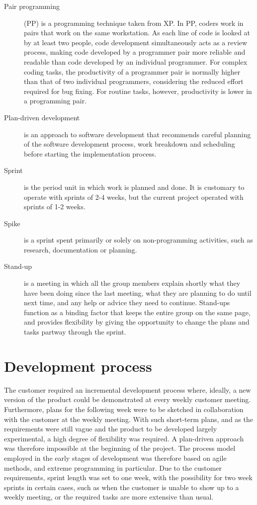 \begin{description}
\item[Pair programming](PP) \label{def:pairprogram} is a programming technique taken from XP. In PP, coders work in pairs that work on the same workstation. As each line of code is looked at by at least two people, code development simultaneously acts as a review process, making code developed by a programmer pair more reliable and readable than code developed by an individual programmer. For complex coding tasks, the productivity of a programmer pair is normally higher than that of two individual programmers, considering the reduced effort required for bug fixing. For routine tasks, however, productivity is lower in a programming pair.

\item[Plan-driven development] \label{def:plan-driven} is an approach to software development that recommends careful planning of the software development process, work breakdown and scheduling before starting the implementation process. 

\item[Sprint] \label{def:sprint} is the period unit in which work is planned and done. It is customary to operate with sprints of 2-4 weeks, but the current project operated with sprints of 1-2 weeks.

\item[Spike] \label{def:spike} is a sprint spent primarily or solely on non-programming activities, such as research, documentation or planning.

\item[Stand-up] \label{def:dailyScrum} is a meeting in which all the group members explain shortly what they have been doing since the last meeting, what they are planning to do until next time, and any help or advice they need to continue. Stand-ups function as a binding factor that keeps the entire group on the same page, and provides flexibility by giving the opportunity to change the plans and tasks partway through the sprint.

\end{description}

\section{Development process}
\label{def:devProcess}
The customer required an incremental development process where, ideally, a new version of the product could be demonstrated at every weekly customer meeting. Furthermore, plans for the following week were to be sketched in collaboration with the customer at the weekly meeting. With such short-term plans, and as the requirements were still vague and the product to be developed largely experimental, a high degree of flexibility was required. A plan-driven approach was therefore impossible at the beginning of the project. The process model employed in the early stages of development was therefore based on agile methods, and extreme programming in particular. Due to the customer requirements, sprint length was set to one week, with the possibility for two week sprints in certain cases, such as when the customer is unable to show up to a weekly meeting, or the required tasks are more extensive than usual. 

